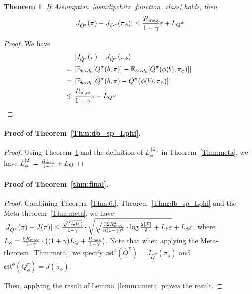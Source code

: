 \documentclass[twoside]{article}
\newtheorem{theorem}{Theorem}
\newcommand{\CAL}[1]{\mathcal{#1}}
\newcommand{\zyh}[1]{{\color{blue}{ [\textbf{Youheng:}} #1]}}
\begin{document}
\begin{theorem}\label{Thm:8}
If Assumption~\ref{asm:lipchitz_function_class} holds, then
    \begin{align}
        |J_{\hat{Q}^\pi}(\pi)-J_{\hat{Q}^\pi}(\pi_\phi)|\leq \frac{R_{\rm max}}{1-\gamma}\varepsilon+L_Q\varepsilon
    \end{align}
\end{theorem}
\begin{proof}
We have
    \begin{align}
        &\ |J_{\hat{Q}^\pi}(\pi)-J_{\hat{Q}^\pi}(\pi_\phi)|\nonumber\\
        =&\ |\mathbb{E}_{b\sim d_0}[\hat{Q}^\pi(b,\pi)]-\mathbb{E}_{b\sim d_0}[\hat{Q}^\pi(\phi(b),\pi_\phi)]|\nonumber\\
        =&\ |\mathbb{E}_{b\sim d_0}[\hat{Q}^\pi(b,\pi)-\hat{Q}^\pi(\phi(b),\pi_\phi)]|\nonumber\\
        \leq&\ \frac{R_{\rm max}}{1-\gamma}\varepsilon+L_Q\varepsilon
    \end{align}
\end{proof}

\paragraph{Proof of Theorem~\ref{Thm:db_sp_Lphi}.}
\begin{proof}
    Using Theorem~\ref{Thm:8} and the definition of $L_\phi^{[2]}$ in Theorem~\ref{Thm:meta}, we have $L_\phi^{[2]}=\frac{R_{\rm max}}{1-\gamma}+L_Q$%
\end{proof}

\paragraph{Proof of Theorem~\ref{thm:final}.}
\begin{proof}
    Combining Theorem~\ref{Thm:6.}, Theorem~\ref{Thm:db_sp_Lphi} and the Meta-theorem~\ref{Thm:meta}, we have $|J_{\hat{Q}^\pi}(\pi)-J(\pi)|\leq\frac{\sqrt{C_\pi(\varepsilon)}}{1-\gamma}\cdot
        \sqrt{\sqrt{\frac{32R_{\rm max}^4}{n(1-\gamma)^4}\cdot\log\frac{2|\mathcal{F}|}{\delta}}+L_{\CAL{E}}\varepsilon}+L_\phi\varepsilon$, where
    $L_\CAL{E}=\frac{8R_{\rm max}}{1-\gamma}\cdot\big((1+\gamma)L_Q+\frac{R_{\rm max}}{1-\gamma}\big)$.
    Note that when applying the Meta-theorem~\ref{Thm:meta}, we specify $\mathfrak{est}^\phi(\hat{Q}^\pi)=J_{\hat{Q}^\pi}(\pi_\phi)$ and $\mathfrak{est}^\phi(Q_\phi^\pi)=J(\pi_\phi)$.
    
    Then, applying the result of Lemma~\ref{lemma:meta} proves the result.
\end{proof}
\end{document}
